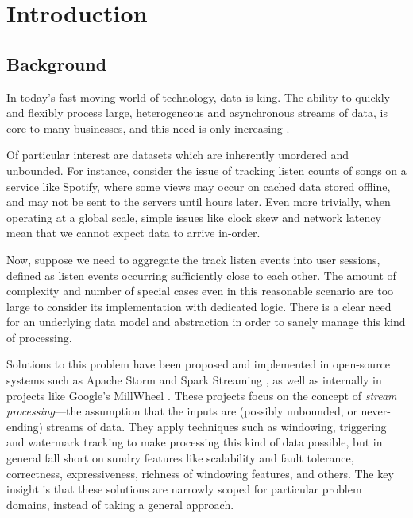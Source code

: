 \chapter{Introduction}\label{ch:intro}

\section{Background}\label{sec:intro:background}

In today's fast-moving world of technology, data is king.
The ability to quickly and flexibly process large, heterogeneous and asynchronous streams of data, is core to many businesses, and this need is only increasing \cite{Yin_2015}\cite{mit_bean_variety}.

Of particular interest are datasets which are inherently unordered and unbounded.
For instance, consider the issue of tracking listen counts of songs on a service like Spotify, where some views may occur on cached data stored offline, and may not be sent to the servers until hours later.
Even more trivially, when operating at a global scale, simple issues like clock skew and network latency mean that we cannot expect data to arrive in-order.

Now, suppose we need to aggregate the track listen events into user sessions, defined as listen events occurring sufficiently close to each other.
The amount of complexity and number of special cases even in this reasonable scenario are too large to consider its implementation with dedicated logic.
There is a clear need for an underlying data model and abstraction in order to sanely manage this kind of processing.

Solutions to this problem have been proposed and implemented in open-source systems such as Apache Storm \cite{apache_storm} and Spark Streaming \cite{spark:zaharia2013discretized}, as well as internally in projects like Google's MillWheel \cite{akidau2013millwheel}.
These projects focus on the concept of \emph{stream processing}---the assumption that the inputs are (possibly unbounded, or never-ending) streams of data.
They apply techniques such as windowing, triggering and watermark tracking to make processing this kind of data possible, but in general fall short on sundry features like scalability and fault tolerance, correctness, expressiveness, richness of windowing features, and others.
The key insight is that these solutions are narrowly scoped for particular problem domains, instead of taking a general approach.

